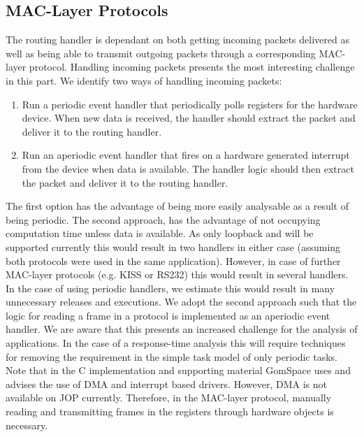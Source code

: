 
\subsection{MAC-Layer Protocols}
The routing handler is dependant on both getting incoming packets delivered as well as being able to transmit outgoing packets through a corresponding MAC-layer protocol. Handling incoming packets presents the most interesting challenge in this part. We identify two ways of handling incoming packets:
\begin{enumerate}
	\item Run a periodic event handler that periodically polls registers for the hardware device. When new data is received, the handler should extract the packet and deliver it to the routing handler.
	\item Run an aperiodic event handler that fires on a hardware generated interrupt from the device when data is available. The handler logic should then extract the packet and deliver it to the routing handler.
\end{enumerate}
 
The first option has the advantage of being more easily analysable as a result of being periodic. The second approach, has the advantage of not occupying computation time unless data is available. As only loopback and \iic will be supported currently this would result in two handlers in either case (assuming both protocols were used in the same application). However, in case of further MAC-layer protocols (e.g. KISS or RS232) this would result in several handlers. In the case of using periodic handlers, we estimate this would result in many unnecessary releases and executions. We adopt the second approach such that the logic for reading a frame in a protocol is implemented as an aperiodic event handler. We are aware that this presents an increased challenge for the analysis of applications. In the case of a response-time analysis this will require techniques for removing the requirement in the simple task model of only periodic tasks. Note that in the C implementation and supporting material GomSpace uses and advises the use of DMA and interrupt based drivers. However, DMA is not available on JOP currently. Therefore, in the \iic MAC-layer protocol, manually reading and transmitting frames in the registers through hardware objects is necessary.
